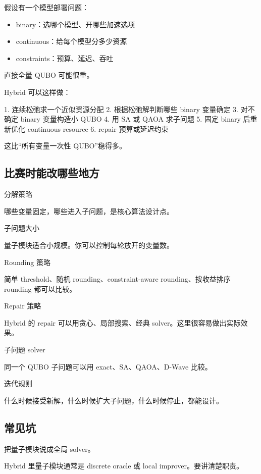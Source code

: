 \documentclass[UTF8,12pt,a4paper]{ctexart}
\begin{document}
假设有一个模型部署问题：

\begin{itemize}
\item binary：选哪个模型、开哪些加速选项
\item continuous：给每个模型分多少资源
\item constraints：预算、延迟、吞吐
\end{itemize}

直接全量 QUBO 可能很重。

Hybrid 可以这样做：

\begin{GuideVerbatim}
1. 连续松弛求一个近似资源分配
2. 根据松弛解判断哪些 binary 变量确定
3. 对不确定 binary 变量构造小 QUBO
4. 用 SA 或 QAOA 求子问题
5. 固定 binary 后重新优化 continuous resource
6. repair 预算或延迟约束
\end{GuideVerbatim}

这比“所有变量一次性 QUBO”稳得多。

\subsection*{比赛时能改哪些地方}

分解策略

哪些变量固定，哪些进入子问题，是核心算法设计点。

子问题大小

量子模块适合小规模。你可以控制每轮放开的变量数。

Rounding 策略

简单 threshold、随机 rounding、constraint-aware rounding、按收益排序 rounding 都可以比较。

Repair 策略

Hybrid 的 repair 可以用贪心、局部搜索、经典 solver。这里很容易做出实际效果。

子问题 solver

同一个 QUBO 子问题可以用 exact、SA、QAOA、D-Wave 比较。

迭代规则

什么时候接受新解，什么时候扩大子问题，什么时候停止，都能设计。

\subsection*{常见坑}

把量子模块说成全局 solver。

Hybrid 里量子模块通常是 discrete oracle 或 local improver。要讲清楚职责。
\end{document}
